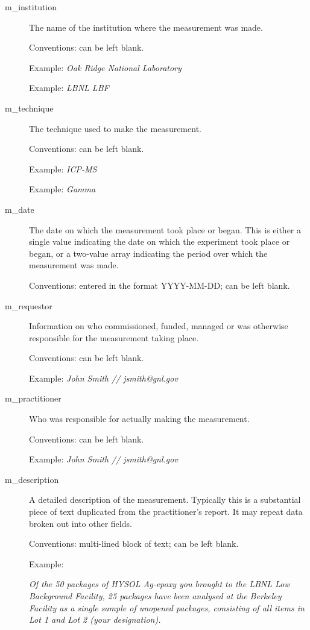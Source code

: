 \documentclass[11pt, letterpaper]{article}
\begin{document}
\newpage
\begin{description}

  \item[m\_institution] The name of the institution where the measurement was made.

  Conventions: can be left blank.
  
  Example: \textit{Oak Ridge National Laboratory}
  
  Example: \textit{LBNL LBF}

  \item[m\_technique] The technique used to make the measurement.

  Conventions: can be left blank.
  
  Example: \textit{ICP-MS}
  
  Example: \textit{Gamma}

  \item[m\_date] The date on which the measurement took place or began. This is either a single value indicating the date on which the experiment took place or began, or a two-value array indicating the period over which the measurement was made.

  Conventions: entered in the format YYYY-MM-DD; can be left blank.

  \item[m\_requestor] Information on who commissioned, funded, managed or was otherwise responsible for the measurement taking place.

  Conventions: can be left blank.
  
  Example: \textit{John Smith // jsmith@gnl.gov}     

  \item[m\_practitioner] Who was responsible for actually making the measurement.

  Conventions: can be left blank.
  
  Example: \textit{John Smith // jsmith@gnl.gov}  
  
  \newpage
  
  \item[m\_description] A detailed description of the measurement. Typically this is a substantial piece of text duplicated from the practitioner's report. It may repeat data broken out into other fields.

  Conventions: multi-lined block of text; can be left blank.
  
  Example: 
  
\textit{Of the 50 packages of HYSOL Ag-epoxy you brought to the LBNL
Low Background Facility, 25 packages have been analysed at the
Berkeley Facility as a single sample of unopened packages,
consisting of all items in Lot 1 and Lot 2 (your designation).}


\end{description}
\end{document}
